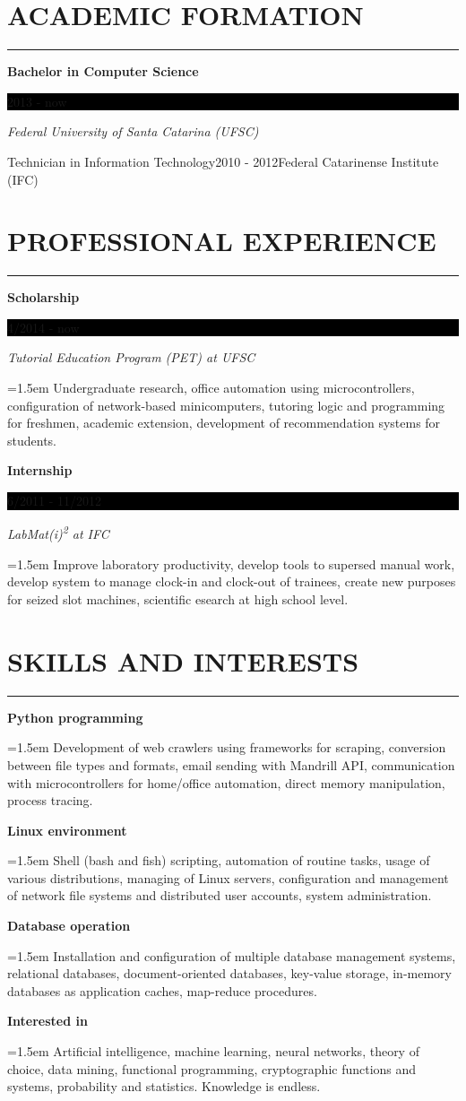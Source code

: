 \documentclass{article}
\newcommand{\formationentry}[4]{%
	\noindent \textbf{#1} \hfill
	\colorbox{black}{%
		\parbox[c][1em]{8em}{%
			\hfill \color{white} #2
		}
	} \par
	\noindent \textit{#3} \par
	\normalsize
	\vspace{0.75em}
}
\newcommand{\experienceentry}[4]{%
	\noindent \textbf{#1} \hfill
	\colorbox{black}{%
		\parbox[c][1em]{8em}{%
			\hfill \color{white} #2
		}
	} \par
	\noindent \textit{#3} \par
	\noindent \hangindent=1.5em \hangafter=0 \small #4 \par
	\normalsize
	\vspace{0.75em}
}
\newcommand{\skillentry}[2]{%
	\noindent \textbf{#1} \hfill \par
	\noindent \hangindent=1.5em \hangafter=0 \small #2 \par
	\normalsize
	\vspace{0.75em}
}
\newenvironment{main}{%
\noindent
\begin{minipage}[t]{\dimexpr0.75\textwidth-1.5em}%
\let\oldsection\section
\renewcommand{\section}[1]{\oldsection*{\uppercase{##1}}\vspace{-0.5em}\hrule\vspace{1em}}
}{%
\let\section\oldsection
\end{minipage}%
}
\begin{document}
\begin{main}%
\section{Academic Formation}
\formationentry{Bachelor in Computer Science}{2013 - now}{Federal University
of Santa Catarina (UFSC)}

\formationentry{Technician in Information Technology}{2010 - 2012}{Federal
Catarinense Institute (IFC)}


\section{Professional Experience}
\experienceentry{Scholarship}{4/2014 - now}{Tutorial Education Program (PET) at
UFSC}{Undergraduate research, office automation using microcontrollers, configuration of network-based minicomputers, tutoring logic and programming for freshmen, academic extension, development of recommendation systems for students.}

\experienceentry{Internship}{6/2011 - 11/2012}{LabMat(i)\textsuperscript{2} at
IFC}{Improve laboratory productivity, develop tools to supersed manual work, develop system to manage clock-in and clock-out of trainees, create new purposes for seized slot machines, scientific esearch at high school level.}


\section{Skills and Interests}
\skillentry{Python programming}{Development of web crawlers using frameworks
for scraping, conversion between file types and formats, email sending with
Mandrill API, communication with microcontrollers for home/office automation,
direct memory manipulation, process tracing.}

\skillentry{Linux environment}{Shell (bash and fish) scripting, automation of routine tasks, usage of various distributions, managing of Linux servers, configuration and management of network file systems and distributed user accounts, system administration.}

\skillentry{Database operation}{Installation and configuration of multiple database management systems, relational databases, document-oriented databases, key-value storage, in-memory databases as application caches, map-reduce procedures.}

\skillentry{Interested in}{Artificial intelligence, machine learning, neural networks, theory of choice, data mining, functional programming, cryptographic functions and systems, probability and statistics. Knowledge is endless.}



\end{main}
\end{document}
